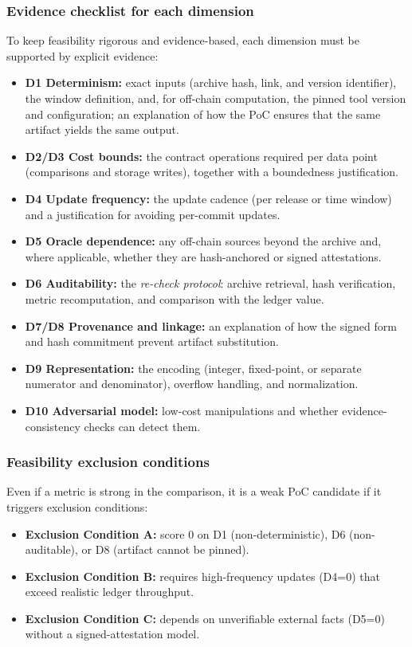 \subsubsection{Evidence checklist for each dimension}
To keep feasibility rigorous and evidence-based, each dimension must be supported by explicit evidence:
\begin{itemize}[leftmargin=*]
  \item \textbf{D1 Determinism:} exact inputs (archive hash, link, and version identifier), the window definition, and, for off-chain computation,
  the pinned tool version and configuration; an explanation of how the PoC ensures that the same artifact yields the same output.
  \item \textbf{D2/D3 Cost bounds:} the contract operations required per data point (comparisons and storage writes), together with a boundedness justification.
  \item \textbf{D4 Update frequency:} the update cadence (per release or time window) and a justification for avoiding per-commit updates.
  \item \textbf{D5 Oracle dependence:} any off-chain sources beyond the archive and, where applicable, whether they are hash-anchored or signed attestations.
  \item \textbf{D6 Auditability:} the \emph{re-check protocol}: archive retrieval, hash verification, metric recomputation, and comparison with the ledger value.
  \item \textbf{D7/D8 Provenance and linkage:} an explanation of how the signed form and hash commitment prevent artifact substitution.
  \item \textbf{D9 Representation:} the encoding (integer, fixed-point, or separate numerator and denominator), overflow handling, and normalization.
  \item \textbf{D10 Adversarial model:} low-cost manipulations and whether evidence-consistency checks can detect them.
\end{itemize}

\subsubsection{Feasibility exclusion conditions}
Even if a metric is strong in the comparison, it is a weak PoC candidate if it triggers exclusion conditions:
\begin{itemize}[leftmargin=*]
  \item \textbf{Exclusion Condition A:} score 0 on D1 (non-deterministic), D6 (non-auditable), or D8 (artifact cannot be pinned).
  \item \textbf{Exclusion Condition B:} requires high-frequency updates (D4=0) that exceed realistic ledger throughput.
  \item \textbf{Exclusion Condition C:} depends on unverifiable external facts (D5=0) without a signed-attestation model.
\end{itemize}

